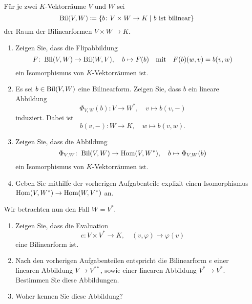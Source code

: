 \documentclass[a4paper,10pt]{article}
\begin{document}


\begin{question}
  Für je zwei $K$-Vektorräume $V$ und $W$ sei
  \[
              \operatorname{Bil}(V, W)
    \coloneqq \{b \colon V \times  W \to K \mid \text{$b$ ist bilinear}\}
  \]
  der Raum der Bilinearformen $V \times W \to K$.
  \begin{enumerate}[leftmargin=*]
    \item
      Zeigen Sie, dass die Flipabbildung
      \[
        F \colon \operatorname{Bil}(V, W) \to \operatorname{Bil}(W, V),
        \quad
        b \mapsto F(b)
        \quad\text{mit}\quad
        F(b)(w,v) = b(v,w)
      \]
      ein Isomorphismus von $K$-Vektorräumen ist.
    \item
      Es sei $b \in \operatorname{Bil}(V, W)$ eine Bilinearform.
      Zeigen Sie, dass $b$ ein lineare Abbildung
      \[
        \Phi_{V,W}(b) \colon V \to W^*,
        \quad
        v \mapsto b(v, -)
      \]
      induziert.
      Dabei ist
      \[
        b(v, -) \colon W \to K,
        \quad
        w \mapsto b(v,w).
      \]
    \item
      Zeigen Sie, dass die Abbildung
      \[
        \Phi_{V,W} \colon \operatorname{Bil}(V, W) \to \mathrm{Hom}(V, W^*),
        \quad
        b \mapsto \Phi_{V,W}(b)
      \]
      ein Isomorphismus von $K$-Vektorräumen ist.
    \item
      Geben Sie mithilfe der vorherigen Aufgabenteile explizit einen Isomorphismus $\mathrm{Hom}(V, W^*) \to \mathrm{Hom}(W, V^*)$ an.
  \end{enumerate}
  Wir betrachten nun den Fall $W = V^*$.
  \begin{enumerate}[resume, leftmargin=*]
    \item
      Zeigen Sie, dass die Evaluation
      \[
        e \colon V \times V^* \to K,
        \quad
        (v, \varphi) \mapsto \varphi(v)
      \]
      eine Bilinearform ist.
   \item
      Nach den vorherigen Aufgabenteilen entspricht die Bilinearform $e$ einer linearen Abbildung $V \to V^{**}$, sowie einer linearen Abbildung $V^* \to V^*$.
      Bestimmen Sie diese Abbildungen.
    \item
      Woher kennen Sie diese Abbildung?
  \end{enumerate}
\end{question}
\end{document}
